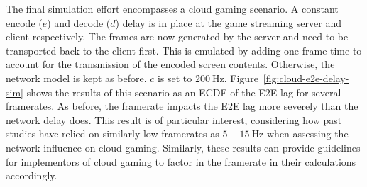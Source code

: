 The final simulation effort encompasses a cloud gaming scenario. A constant encode ($e$) and decode ($d$) delay is in place at the game streaming server and client respectively. The frames are now generated by the server and need to be transported back to the client first. This is emulated by adding one frame time to account for the transmission of the encoded screen contents. Otherwise, the network model is kept as before. $c$ is set to $\SI{200}{\hertz}$. Figure~\ref{fig:cloud-e2e-delay-sim} shows the results of this scenario as an \acrshort{ECDF} of the \gls{E2E} lag for several framerates. As before, the framerate impacts the \gls{E2E} lag more severely than the network delay does. This result is of particular interest, considering how past studies have relied on similarly low framerates as $5-\SI{15}{\hertz}$ when assessing the network influence on cloud gaming. Similarly, these results can provide guidelines for implementors of cloud gaming to factor in the framerate in their calculations accordingly.


